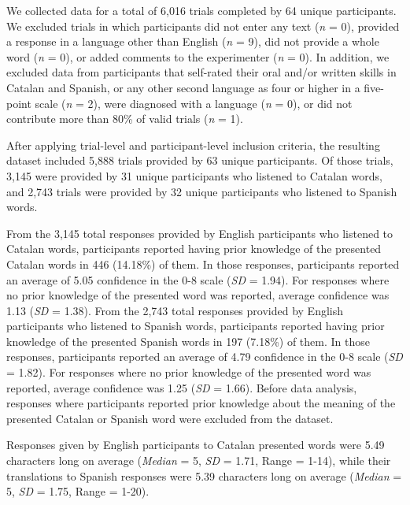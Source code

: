 \documentclass[
]{article}
\begin{document}
We collected data for a total of 6,016 trials completed by 64 unique
participants. We excluded trials in which participants did not enter any
text (\emph{n} = 0), provided a response in a language other than
English (\emph{n} = 9), did not provide a whole word (\emph{n} = 0), or
added comments to the experimenter (\emph{n} = 0). In addition, we
excluded data from participants that self-rated their oral and/or
written skills in Catalan and Spanish, or any other second language as
four or higher in a five-point scale (\emph{n} = 2), were diagnosed with
a language (\emph{n} = 0), or did not contribute more than 80\% of valid
trials (\emph{n} = 1).

After applying trial-level and participant-level inclusion criteria, the
resulting dataset included 5,888 trials provided by 63 unique
participants. Of those trials, 3,145 were provided by 31 unique
participants who listened to Catalan words, and 2,743 trials were
provided by 32 unique participants who listened to Spanish words.

From the 3,145 total responses provided by English participants who
listened to Catalan words, participants reported having prior knowledge
of the presented Catalan words in 446 (14.18\%) of them. In those
responses, participants reported an average of 5.05 confidence in the
0-8 scale (\emph{SD} = 1.94). For responses where no prior knowledge of
the presented word was reported, average confidence was 1.13 (\emph{SD}
= 1.38). From the 2,743 total responses provided by English participants
who listened to Spanish words, participants reported having prior
knowledge of the presented Spanish words in 197 (7.18\%) of them. In
those responses, participants reported an average of 4.79 confidence in
the 0-8 scale (\emph{SD} = 1.82). For responses where no prior knowledge
of the presented word was reported, average confidence was 1.25
(\emph{SD} = 1.66). Before data analysis, responses where participants
reported prior knowledge about the meaning of the presented Catalan or
Spanish word were excluded from the dataset.

Responses given by English participants to Catalan presented words were
5.49 characters long on average (\emph{Median} = 5, \emph{SD} = 1.71,
Range = 1-14), while their translations to Spanish responses were 5.39
characters long on average (\emph{Median} = 5, \emph{SD} = 1.75, Range =
1-20).
\end{document}
